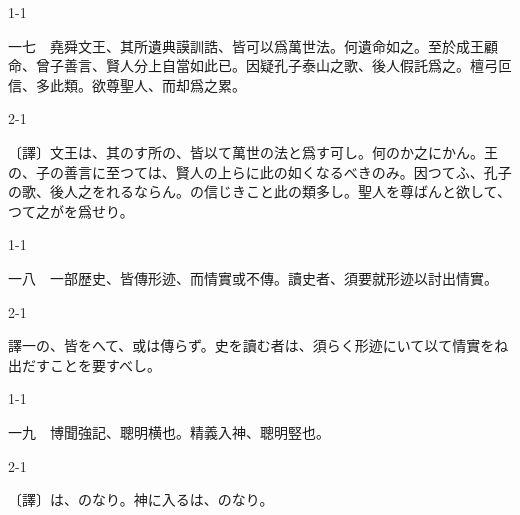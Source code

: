 \documentclass[tate,paper=b6j,jafontsize=9pt]{jlreq}
\begin{document}
\begin{azconvIndented}{1\zw}{-1\zw}

一七　堯舜文王、其所遺典謨訓誥、皆可以爲萬世法。何遺命如之。至於成王顧命、曾子善言、賢人分上自當如此已。因疑孔子泰山之歌、後人假託爲之。檀弓叵信、多此類。欲尊聖人、而却爲之累。

\end{azconvIndented}
\begin{azconvIndented}{2\zw}{-1\zw}

〔譯〕文王は、其のす所の、皆以て萬世の法と爲す可し。何のか之にかん。王の、子の善言に至つては、賢人の上らに此の如くなるべきのみ。因つてふ、孔子の歌、後人之をれるならん。の信じきこと此の類多し。聖人を尊ばんと欲して、つて之がを爲せり。

\end{azconvIndented}

\begin{azconvIndented}{1\zw}{-1\zw}

一八　一部歴史、皆傳形迹、而情實或不傳。讀史者、須要就形迹以討出情實。

\end{azconvIndented}
\begin{azconvIndented}{2\zw}{-1\zw}

譯一の、皆をへて、或は傳らず。史を讀む者は、須らく形迹にいて以て情實をね出だすことを要すべし。

\end{azconvIndented}

\begin{azconvIndented}{1\zw}{-1\zw}

一九　博聞強記、聰明横也。精義入神、聰明竪也。

\end{azconvIndented}
\begin{azconvIndented}{2\zw}{-1\zw}

〔譯〕は、のなり。神に入るは、のなり。

\end{azconvIndented}
\end{document}
